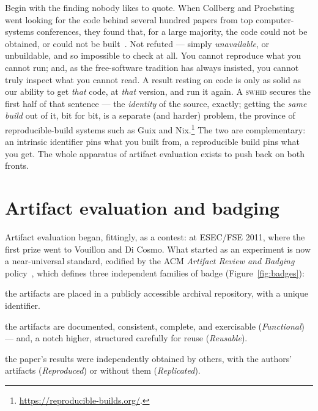 Begin with the finding nobody likes to quote. When Collberg and Proebsting went looking for the code behind
several hundred papers from top computer-systems conferences, they found that, for a large majority,
the code could not be obtained, or could not be built~\autocite{Collberg2016}. Not refuted ---
simply \emph{unavailable}, or unbuildable, and so impossible to check at all. You cannot reproduce
what you cannot run; and, as the free-software tradition has always insisted, you cannot truly
inspect what you cannot read. A result resting on code is only as solid as our ability to get
\emph{that} code, at \emph{that} version, and run it again. A \textsc{swhid} secures the first half
of that sentence --- the \emph{identity} of the source, exactly; getting the \emph{same build} out
of it, bit for bit, is a separate (and harder) problem, the province of reproducible-build systems
such as Guix and Nix.\footnote{\url{https://reproducible-builds.org/}.} The two are complementary:
an intrinsic identifier pins what you built from, a reproducible build pins what you get. The whole
apparatus of artifact evaluation exists to push back on both fronts.

\section{Artifact evaluation and badging}

Artifact evaluation began, fittingly, as a contest: at ESEC/FSE 2011, where the first prize went to
Vouillon and Di Cosmo. What started as an experiment is now a near-universal standard, codified by
the ACM \emph{Artifact Review and Badging} policy~\autocite{acmbadging}, which defines three
independent families of badge (Figure~\ref{fig:badges}):

\begin{description}[leftmargin=!,labelwidth=3.6cm,font=\bfseries\sffamily]
  \item[Artifacts Available] the artifacts are placed in a publicly accessible archival repository,
        with a unique identifier.
  \item[Artifacts Evaluated] the artifacts are documented, consistent, complete, and exercisable
        (\emph{Functional}) --- and, a notch higher, structured carefully for reuse
        (\emph{Reusable}).
  \item[Results Reproduced] the paper's results were independently obtained by others, with the
        authors' artifacts (\emph{Reproduced}) or without them (\emph{Replicated}).
\end{description}

